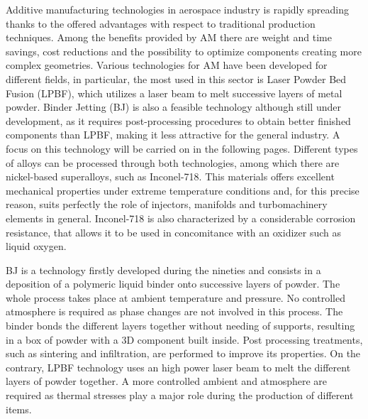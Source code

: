Additive manufacturing technologies in aerospace industry is rapidly spreading thanks to the offered advantages with respect to traditional production techniques. Among the benefits provided by AM there are weight and time savings, cost reductions and  the possibility to optimize components creating more complex geometries\cite{materials_and_desing}.
Various technologies for AM have been developed for different fields, in particular, the most used in this sector is Laser Powder Bed Fusion (LPBF), which utilizes a laser beam to melt successive layers of metal powder. Binder Jetting (BJ) is also a feasible technology although still under development, as it requires post-processing procedures to obtain better finished components than LPBF, making it less attractive for the general industry. A focus on this technology will be carried on in the following pages. Different types of alloys can be processed through both technologies, among which there are nickel-based superalloys, such as Inconel-718. This materials offers excellent mechanical properties under extreme temperature conditions and, for this precise reason, suits perfectly the role of injectors, manifolds and turbomachinery elements in general. Inconel-718 is also characterized by a considerable corrosion resistance, that allows it to be used in concomitance with an oxidizer such as liquid oxygen\cite{Inconel_vs_steel}. 


BJ is a technology firstly developed during the nineties and consists in a deposition of a polymeric liquid binder onto successive layers of powder. The whole process takes place at ambient temperature and pressure. No controlled atmosphere is required as phase changes are not involved in this process. The binder bonds the different layers together without needing of supports, resulting in a box of powder with a 3D component built inside. Post processing treatments, such as sintering and infiltration, are performed to improve its properties\cite{bj_inconel}. On the contrary, LPBF technology uses an high power laser beam to melt the different layers of powder together. A more controlled ambient and atmosphere are required as thermal stresses play a major role during the production of different items\cite{materials_and_desing}.

